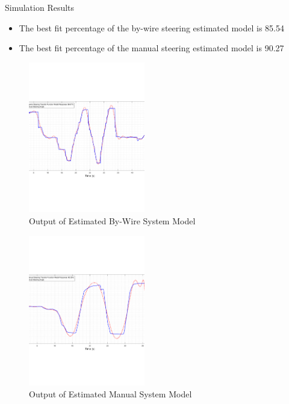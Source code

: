 \documentclass{beamer}
\begin{document}
\begin{frame}{Simulation Results}
  \begin{block}{}
 \begin{itemize}
	\item The best fit percentage of the by-wire steering estimated model is 85.54
	\item The best fit percentage of the manual steering estimated model is 90.27
 \end{itemize}
\begin{figure}
    \centering
    \captionsetup{justification=centering, margin=3cm}
    \includegraphics[width=2in]{figs/img/byWireSteeringTransferFunctionModel}
    \caption{Output of Estimated By-Wire System Model}
    \label{fig:byWireSteerModel}
\end{figure}
\begin{figure}
    \centering
    \captionsetup{justification=centering, margin=3cm}
    \includegraphics[width=2in]{figs/img/manualSteeringTransferFunctionModel}
    \caption{Output of Estimated Manual System Model}
    \label{fig:manualSteerModel}
\end{figure}
  \end{block}
\end{frame}

\end{document}
